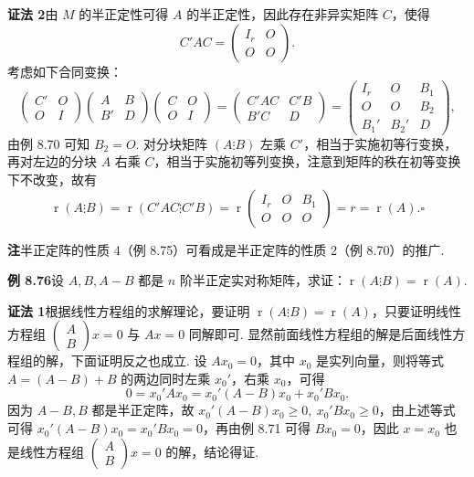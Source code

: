 \documentclass[UTF8, 12pt, fontset=fandol, oneside]{ctexart}
\begin{document}
\noindent\textbf{证法 2}\quad 由 $M$ 的半正定性可得 $A$ 的半正定性，因此存在非异实矩阵 $C$，使得
\[
C'AC=\left(\begin{array}{cc}
I_r & O\\
O & O
\end{array}\right).
\]
考虑如下合同变换：
\[
\left(\begin{array}{cc}
C' & O\\
O & I
\end{array}\right)
\left(\begin{array}{cc}
A & B\\
B' & D
\end{array}\right)
\left(\begin{array}{cc}
C & O\\
O & I
\end{array}\right)
=
\left(\begin{array}{cc}
C'AC & C'B\\
B'C & D
\end{array}\right)
=
\left(\begin{array}{ccc}
I_r & O & B_1\\
O & O & B_2\\
B_1' & B_2' & D
\end{array}\right),
\]
由例 8.70 可知 $B_2=O$. 对分块矩阵 $(A\vdots B)$ 左乘 $C'$，相当于实施初等行变换，再对左边的分块 $A$ 右乘 $C$，相当于实施初等列变换，注意到矩阵的秩在初等变换下不改变，故有
\[
\operatorname{r}(A\vdots B)=\operatorname{r}(C'AC\vdots C'B)
=\operatorname{r}\left(\begin{array}{ccc}
I_r & O & B_1\\
O & O & O
\end{array}\right)=r=\operatorname{r}(A). \ensuremath{\square}
\]

\noindent\textbf{注}\quad 半正定阵的性质 4（例 8.75）可看成是半正定阵的性质 2（例 8.70）的推广.

\noindent\textbf{例 8.76}\quad 设 $A,B,A-B$ 都是 $n$ 阶半正定实对称矩阵，求证：$\operatorname{r}(A\vdots B)=\operatorname{r}(A)$.

\noindent\textbf{证法 1}\quad 根据线性方程组的求解理论，要证明 $\operatorname{r}(A\vdots B)=\operatorname{r}(A)$，只要证明线性方程组 $\left(\begin{array}{c}A\\ B\end{array}\right)x=0$ 与 $Ax=0$ 同解即可. 显然前面线性方程组的解是后面线性方程组的解，下面证明反之也成立. 设 $Ax_0=0$，其中 $x_0$ 是实列向量，则将等式 $A=(A-B)+B$ 的两边同时左乘 $x_0'$，右乘 $x_0$，可得
\[
0=x_0'Ax_0=x_0'(A-B)x_0+x_0'Bx_0.
\]
因为 $A-B,B$ 都是半正定阵，故 $x_0'(A-B)x_0\ge 0,\ x_0'Bx_0\ge 0$，由上述等式可得 $x_0'(A-B)x_0=x_0'Bx_0=0$，再由例 8.71 可得 $Bx_0=0$，因此 $x=x_0$ 也是线性方程组 $\left(\begin{array}{c}A\\ B\end{array}\right)x=0$ 的解，结论得证.
\end{document}

